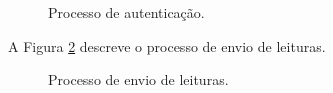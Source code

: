 \begin{figure}[ht!]
\begin{center}
\caption{Processo de autenticação.}
\label{fig:state_autenticacao}
\end{center}
\end{figure}

A Figura \ref{fig:state_envio} descreve o processo de envio de leituras.

\begin{figure}[ht!]
\begin{center}
\caption{Processo de envio de leituras.}
\label{fig:state_envio}
\end{center}
\end{figure}

